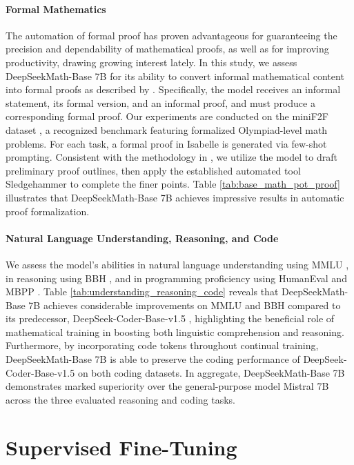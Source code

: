 \begin{itemize}[topsep=0pt]
\paragraph{Formal Mathematics}

The automation of formal proof has proven advantageous for guaranteeing the precision and dependability of mathematical proofs, as well as for improving productivity, drawing growing interest lately. In this study, we assess DeepSeekMath-Base 7B for its ability to convert informal mathematical content into formal proofs as described by \citep{dsp_proof}. Specifically, the model receives an informal statement, its formal version, and an informal proof, and must produce a corresponding formal proof. Our experiments are conducted on the miniF2F dataset \citep{minif2f}, a recognized benchmark featuring formalized Olympiad-level math problems. For each task, a formal proof in Isabelle is generated via few-shot prompting. Consistent with the methodology in \cite{dsp_proof}, we utilize the model to draft preliminary proof outlines, then apply the established automated tool Sledgehammer \citep{sledgehammer} to complete the finer points. Table \ref{tab:base_math_pot_proof} illustrates that DeepSeekMath-Base 7B achieves impressive results in automatic proof formalization.

\paragraph{Natural Language Understanding, Reasoning, and Code}

We assess the model’s abilities in natural language understanding using MMLU \citep{mmlu}, in reasoning using BBH \citep{bbh}, and in programming proficiency using HumanEval \citep{codex} and MBPP \citep{mbpp}. Table \ref{tab:understanding_reasoning_code} reveals that DeepSeekMath-Base 7B achieves considerable improvements on MMLU and BBH compared to its predecessor, DeepSeek-Coder-Base-v1.5 \citep{deepseek-coder}, highlighting the beneficial role of mathematical training in boosting both linguistic comprehension and reasoning. Furthermore, by incorporating code tokens throughout continual training, DeepSeekMath-Base 7B is able to preserve the coding performance of DeepSeek-Coder-Base-v1.5 on both coding datasets. In aggregate, DeepSeekMath-Base 7B demonstrates marked superiority over the general-purpose model Mistral 7B \citep{mistral} across the three evaluated reasoning and coding tasks.

\section{Supervised Fine-Tuning}


\end{itemize}
